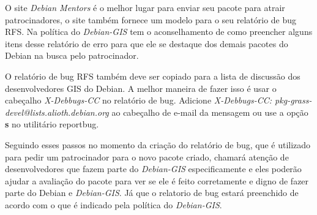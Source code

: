 O site \textit{Debian Mentors} é o melhor lugar para enviar seu pacote para atrair patrocinadores, o site também fornece um modelo para o seu relatório de bug RFS. Na política do \textit{Debian-GIS} tem o aconselhamento de como preencher alguns itens desse relatório de erro para que ele se destaque dos demais pacotes do Debian na busca pelo patrocinador.

O relatório de bug RFS também deve ser copiado para a lista de discussão dos desenvolvedores GIS do Debian. A melhor maneira de fazer isso é usar o cabeçalho\textit{ X-Debbugs-CC} no relatório de bug. Adicione \textit{X-Debbugs-CC: pkg-grass-devel@lists.alioth.debian.org} ao cabeçalho de e-mail da mensagem ou use a opção \textbf{s} no utilitário reportbug.

Seguindo esses passos no momento da criação do relatório de bug, que é utilizado para pedir um patrocinador para o novo pacote criado, chamará atenção de desenvolvedores que fazem parte do \textit{Debian-GIS} especificamente e eles poderão ajudar a avaliação do pacote para ver se ele é feito corretamente e digno de fazer parte do Debian e \textit{Debian-GIS}. Já que o relatorio de bug estará preenchido de acordo com o que é indicado pela política do \textit{Debian-GIS}.